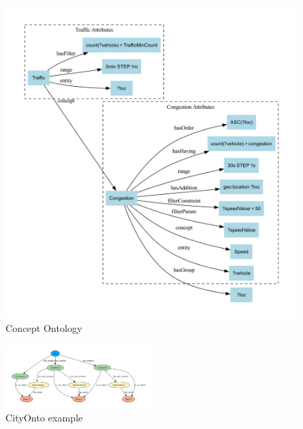 \documentclass[5p,times]{elsarticle}
\begin{document}
 \begin{figure}[t] %
  \centering
  \includegraphics[width=\columnwidth]{ConceptOnto_GraphViz_new.pdf}
  \caption{Concept Ontology}
  \label{fig:conceptonto}
\end{figure}







\begin{figure}[t]
  \centering
  \includegraphics[width=0.5\textwidth]{cityOnto_graph.pdf}
  \caption{CityOnto example}
  \label{fig:CityOnto}
\end{figure}
\end{document}
